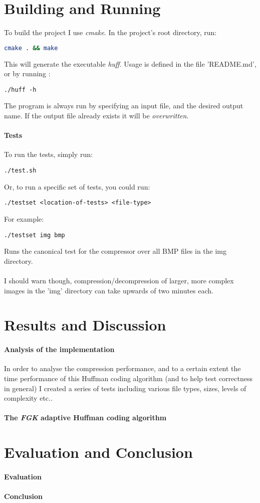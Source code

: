 \documentclass[]{article}
\begin{document}
\section{Building and Running}
To build the project I use \emph{cmake}. In the project's root directory, run:
\begin{lstlisting}[language=bash]
cmake . && make
\end{lstlisting}
This will generate the executable \emph{huff}. Usage is defined in the file 'README.md', or by running :
\begin{lstlisting}
./huff -h
\end{lstlisting}
The program is always run by specifying an input file, and the desired output name. If the output file already exists it will be \emph{overwritten}.
\paragraph{Tests} To run the tests, simply run:
\begin{lstlisting}
./test.sh
\end{lstlisting}
Or, to run a specific set of tests, you could run:
\begin{lstlisting}
./testset <location-of-tests> <file-type>
\end{lstlisting}
For example:
\begin{lstlisting}
./testset img bmp
\end{lstlisting}
Runs the canonical test for the compressor over all BMP files in the img directory.
\\\\
I should warn though, compression/decompression of larger, more complex images in the 'img' directory can take upwards of two minutes each.
\section{Results and Discussion}
\paragraph{Analysis of the implementation} In order to analyse the compression performance, and to a certain extent the time performance of this Huffman coding algorithm (and to help test correctness in general) I created a series of tests including various file types, sizes, levels of complexity etc..
\paragraph{The \emph{FGK} adaptive Huffman coding algorithm}
\section{Evaluation and Conclusion}
\paragraph{Evaluation}
\paragraph{Conclusion}

 
\end{document}
